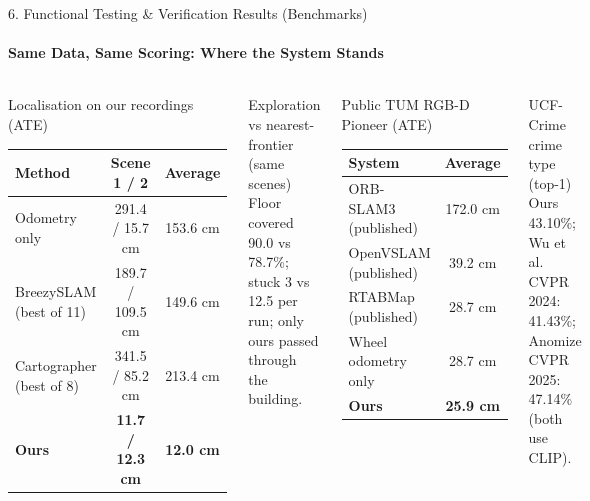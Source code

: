 \documentclass[aspectratio=169, 11pt]{beamer}
\begin{document}
\begin{frame}{6. Functional Testing \& Verification Results (Benchmarks)}
    \framesubtitle{Same Data, Same Scoring: Where the System Stands}
    \begin{columns}[T]
        \begin{block}{Localisation on our recordings (ATE)}
            \scriptsize
            \begin{tabular}{lcc}
                \toprule
                \textbf{Method} & \textbf{Scene 1 / 2} & \textbf{Average} \\
                \midrule
                Odometry only & 291.4 / 15.7 cm & 153.6 cm \\
                BreezySLAM (best of 11) & 189.7 / 109.5 cm & 149.6 cm \\
                Cartographer (best of 8) & 341.5 / 85.2 cm & 213.4 cm \\
                \textbf{Ours} & \textbf{11.7 / 12.3 cm} & \textbf{12.0 cm} \\
                \bottomrule
            \end{tabular}
        \end{block}
        \begin{block}{Exploration vs nearest-frontier (same scenes)}
            \scriptsize
            Floor covered 90.0 vs 78.7\%; stuck 3 vs 12.5 per run; only ours passed through the building.
        \end{block}

        \begin{block}{Public TUM RGB-D Pioneer (ATE)}
            \scriptsize
            \begin{tabular}{lc}
                \toprule
                \textbf{System} & \textbf{Average} \\
                \midrule
                ORB-SLAM3 (published) & 172.0 cm \\
                OpenVSLAM (published) & 39.2 cm \\
                RTABMap (published) & 28.7 cm \\
                Wheel odometry only & 28.7 cm \\
                \textbf{Ours} & \textbf{25.9 cm} \\
                \bottomrule
            \end{tabular}
        \end{block}
        \begin{block}{UCF-Crime crime type (top-1)}
            \scriptsize
            Ours 43.10\%; Wu et al. CVPR 2024: 41.43\%; Anomize CVPR 2025: 47.14\% (both use CLIP).
        \end{block}
    \end{columns}
\end{frame}
\end{document}
